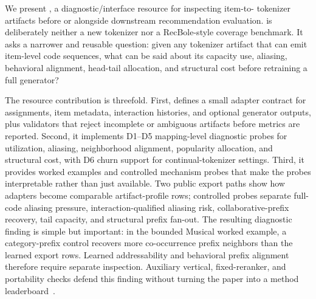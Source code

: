 We present \tool, a diagnostic/interface resource for inspecting item-to-\sid{}
tokenizer artifacts before or alongside downstream recommendation evaluation.
\tool is deliberately neither a new tokenizer nor a RecBole-style coverage
benchmark. It asks a narrower and reusable question: given any tokenizer
artifact that can emit item-level code sequences, what can be said about its
capacity use, aliasing, behavioral alignment, head-tail allocation, and
structural cost before retraining a full generator?

The resource contribution is threefold. First, \tool defines a small adapter
contract for \sid assignments, item metadata, interaction histories, and
optional generator outputs, plus validators that reject incomplete or
ambiguous artifacts before metrics are reported. Second, it implements
D1--D5 mapping-level diagnostic probes for utilization, aliasing,
neighborhood alignment, popularity allocation, and structural cost, with D6
churn support for continual-tokenizer settings.
Third, it provides worked examples and controlled mechanism probes that make
the probes interpretable rather than just available. Two public \sid export
paths show how adapters become comparable artifact-profile rows; controlled
probes separate full-code aliasing pressure, interaction-qualified aliasing
risk, collaborative-prefix recovery, tail capacity, and structural prefix
fan-out. The resulting diagnostic finding is simple but important: in the
bounded Musical worked example, a category-prefix control recovers more
co-occurrence prefix neighbors than the learned export rows. Learned
addressability and behavioral prefix alignment therefore require separate
inspection. Auxiliary vertical, fixed-reranker, and portability checks defend
this finding without turning the paper into a method leaderboard~\cite{cikm2026resource}.
